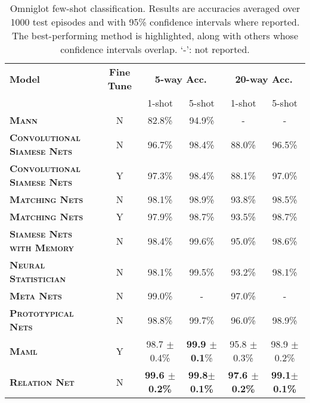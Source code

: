 \documentclass[10pt,twocolumn,letterpaper]{article}
\begin{document}
\setlength{\tabcolsep}{10pt}
\begin{table*}[t]
\centering
\footnotesize
\begin{tabular}{@{} lccccc @{}}
\toprule
\multirow{2}{*}{\bf Model} & \multirow{2}{*}{\bf Fine Tune} &\multicolumn{2}{c}{\multirow{2}{*}{\bf 5-way Acc.}} &\multicolumn{2}{c}{\multirow{2}{*}{\bf 20-way Acc.}}\\
& \multicolumn{2}{c}{} & \multicolumn{2}{c}{} \\
& & 1-shot & 5-shot & 1-shot &5-shot  \\
\midrule 

\textbf{\textsc{Mann}} \cite{santoro2016meta} & N  & 82.8\% & 94.9\% & - &- \\
\textbf{\textsc{Convolutional} \textsc{Siamese} \textsc{Nets}} \cite{koch2015siamese}& N  &96.7\% &98.4\% &88.0\% &96.5\% \\ 
\textbf{\textsc{Convolutional} \textsc{Siamese} \textsc{Nets}} \cite{koch2015siamese}& Y  &97.3\% &98.4\% &88.1\% &97.0\% \\ 
\textbf{\textsc{Matching} \textsc{Nets}} \cite{vinyals2016matching}& N & 98.1\% & 98.9\% &93.8\% & 98.5\% \\
\textbf{\textsc{Matching} \textsc{Nets}} \cite{vinyals2016matching}& Y &97.9\% &98.7\% &93.5\% &98.7\% \\ 
\textbf{\textsc{Siamese} \textsc{Nets} \textsc{with} \textsc{Memory}} \cite{kaiser2017learning}&N&98.4\% &99.6\% &95.0\% &98.6\% \\
\textbf{\textsc{Neural} \textsc{Statistician}} \cite{edwards2016towards}&  N& 98.1\%& 99.5\%& 93.2\% &  98.1\%\\ 
\textbf{\textsc{Meta} \textsc{Nets}} \cite{munkhdalai2017meta}& N &99.0\% & - & 97.0\% & -\\ 
\textbf{\textsc{Prototypical} \textsc{Nets}} \cite{snell2017prototypical}&N  &98.8\% &99.7\%  &96.0\% &98.9\% \\ 
\textbf{\textsc{Maml}} \cite{finn2017model}& Y &98.7 $\pm$ 0.4\% &\textbf{99.9 $\pm$ 0.1}\% &95.8 $\pm$ 0.3\% &98.9 $\pm$ 0.2\% \\ 
\midrule
\textbf{\textsc{Relation} \textsc{Net}}&N& \textbf{99.6 $\pm$ 0.2\%} &\textbf{99.8$\pm$ 0.1\%} &\textbf{97.6 $\pm$ 0.2\%} &\textbf{99.1$\pm$ 0.1\%}\\ 
\bottomrule
\end{tabular}
\caption{\small 
Omniglot few-shot classification. Results are accuracies averaged over 1000 test episodes and with 95\% confidence intervals where reported. The best-performing method is highlighted, along with others whose confidence intervals overlap. `-': not reported.
}
\label{tab:omni}
\vspace{-1em}
\end{table*}
\end{document}
